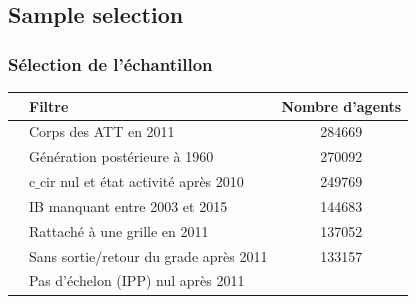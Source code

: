 \documentclass[xcolor=table,ignorenonframetext,12pt]{beamer}
\begin{document}
\subsection{Sample selection}
\begin{frame}
\frametitle{Sélection de l'échantillon}
\begin{table}
\begin{tabular}{llc}
\toprule
& 		 						 Filtre &  Nombre d'agents\\
\midrule
&     	          Corps des ATT en 2011 &  284669 \\
&     	  Génération postérieure à 1960 &  270092 \\
& c${\_}$cir nul et état activité après 2010 &  249769 \\
&        IB manquant entre 2003 et 2015 &  144683 \\
&         Rattaché à une grille en 2011 &  137052 \\
&Sans sortie/retour du grade après 2011 &  133157 \\
& 		 	 Pas d'échelon (IPP) nul après 2011 &  \boxed{105110} \\
\bottomrule
\end{tabular}
\end{table}

\end{frame}
\end{document}
